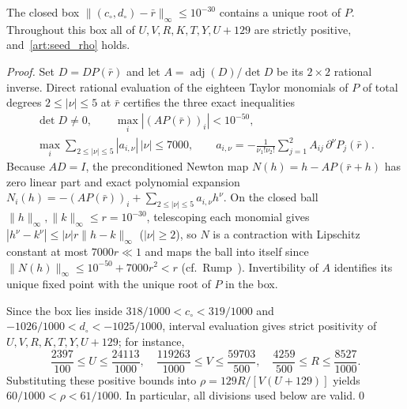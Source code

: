 \begin{lemma}\label{art:root_certificate}
The closed box $\|(c_\circ,d_\circ)-\bar r\|_\infty\le10^{-30}$ contains a unique
root of $P$. Throughout this box all of $U,V,R,K,T,Y,U+129$ are strictly
positive, and~\eqref{art:seed_rho} holds.
\end{lemma}
\begin{proof}
Set $D=DP(\bar r)$ and let $A=\operatorname{adj}(D)/\det D$ be its $2\times2$
rational inverse. Direct rational evaluation of the eighteen Taylor monomials of
$P$ of total degrees $2\le|\nu|\le5$ at $\bar r$ certifies the three exact
inequalities
\begin{equation}\label{art:root_arithmetic}
 \begin{gathered}
 \det D\ne0,\qquad
 \max_i |(AP(\bar r))_i|<10^{-50},\\
 \max_i\sum_{2\le|\nu|\le5}|a_{i,\nu}|\,|\nu|\le7000,
 \qquad
 a_{i,\nu}=-\frac{1}{\nu_1!\nu_2!}\sum_{j=1}^2A_{ij}\,\partial^\nu P_j(\bar r).
 \end{gathered}
\end{equation}
Because $AD=I$, the preconditioned Newton map $N(h)=h-AP(\bar r+h)$ has zero
linear part and exact polynomial expansion
$N_i(h)=-(AP(\bar r))_i+\sum_{2\le|\nu|\le5}a_{i,\nu}h^\nu$. On the closed ball
$\|h\|_\infty,\|k\|_\infty\le r=10^{-30}$, telescoping each monomial gives
$|h^\nu-k^\nu|\le|\nu|r\|h-k\|_\infty$ ($|\nu|\ge2$), so $N$ is a contraction
with Lipschitz constant at most $7000r\ll1$ and maps the ball into itself since
$\|N(h)\|_\infty\le10^{-50}+7000r^2<r$ (cf.\ Rump~\cite[Theorem~13.3]{NEG_RUMP10}).
Invertibility of $A$ identifies its unique fixed point with the unique root of
$P$ in the box.

Since the box lies inside $318/1000<c_\circ<319/1000$ and
$-1026/1000<d_\circ<-1025/1000$, interval evaluation gives strict positivity of
$U,V,R,K,T,Y,U+129$; for instance,
\[
 \frac{2397}{100}\le U\le\frac{24113}{1000},\quad
 \frac{119263}{1000}\le V\le\frac{59703}{500},\quad
 \frac{4259}{500}\le R\le\frac{8527}{1000}.
\]
Substituting these positive bounds into $\rho=129R/[V(U+129)]$ yields
$60/1000<\rho<61/1000$. In particular, all divisions used below are valid.\qed
\end{proof}

